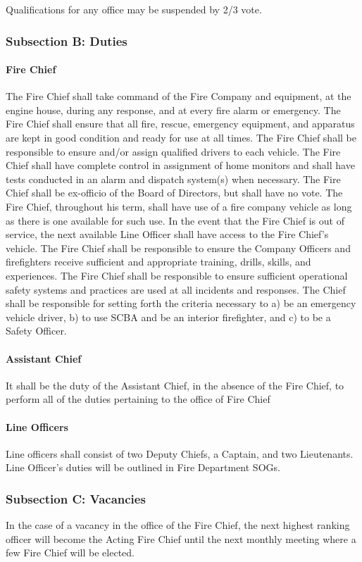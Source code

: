 ﻿\documentclass[12pt,letterpaper]{article}
\begin{document}
Qualifications for any office may be suspended by 2/3 vote.

\subsubsection*{Subsection B: Duties}
\paragraph{Fire Chief}
The Fire Chief shall take command of the Fire Company and equipment, at the engine house, during any response, and at every fire alarm or emergency. The Fire Chief shall ensure that all fire, rescue, emergency equipment, and apparatus are kept in good condition and ready for use at all times. The Fire Chief shall be responsible to ensure and/or assign qualified drivers to each vehicle. The Fire Chief shall have complete control in assignment of home monitors and shall have tests conducted in an alarm and dispatch system(s) when necessary. The Fire Chief shall be ex-officio of the Board of Directors, but shall have no vote. The Fire Chief, throughout his term, shall have use of a fire company vehicle as long as there is one available for such use. In the event that the Fire Chief is out of service, the next available Line Officer shall have access to the Fire Chief’s vehicle. The Fire Chief shall be responsible to ensure the Company Officers and firefighters receive sufficient and appropriate training, drills, skills, and experiences. The Fire Chief shall be responsible to ensure sufficient operational safety systems and practices are used at all incidents and responses. The Chief shall be responsible for setting forth the criteria necessary to a) be an emergency vehicle driver, b) to use SCBA and be an interior firefighter, and c) to be a Safety Officer.
\paragraph{Assistant Chief}
It shall be the duty of the Assistant Chief, in the absence of the Fire Chief, to perform all of the duties pertaining to the office of Fire Chief
\paragraph{Line Officers}
Line officers shall consist of two Deputy Chiefs, a Captain, and two Lieutenants.  Line Officer’s duties will be outlined in Fire Department SOGs.

\subsubsection*{Subsection C: Vacancies}
In the case of a vacancy in the office of the Fire Chief, the next highest ranking officer will become the Acting Fire Chief until the next monthly meeting where a few Fire Chief will be elected.
\end{document}
